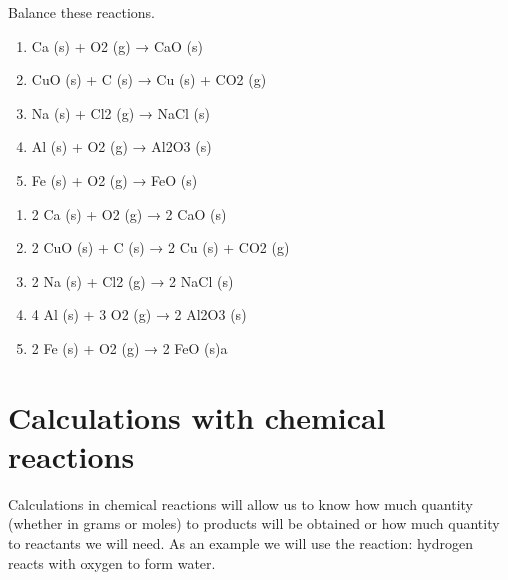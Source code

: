 \begin{exercise}
    Balance these reactions.
    \begin{enumerate}[label=\letraminuscula]
            \item Ca (s) + O2 (g) → CaO (s)
            \item CuO (s) + C (s) → Cu (s) + CO2 (g)
            \item Na (s) + Cl2 (g) → NaCl (s)
            \item Al (s) + O2 (g) → Al2O3 (s)
            \item Fe (s) + O2 (g) → FeO (s)
    \end{enumerate}
    \begin{solu}
        \begin{enumerate}[label=\letraminuscula]
                \item 2 Ca (s) + O2 (g) → 2 CaO (s)
                \item 2 CuO (s) + C (s) → 2 Cu (s) + CO2 (g)
                \item 2 Na (s) + Cl2 (g) → 2 NaCl (s)
                \item 4 Al (s) + 3 O2 (g) → 2 Al2O3 (s)
                \item 2 Fe (s) + O2 (g) → 2 FeO (s)a
        \end{enumerate}
    \end{solu}
\end{exercise}


\section{Calculations with chemical reactions}

Calculations in chemical reactions will allow us to know how much quantity (whether in grams or moles) to products will be obtained or how much quantity to reactants we will need.
As an example we will use the reaction: hydrogen reacts with oxygen to form water.

